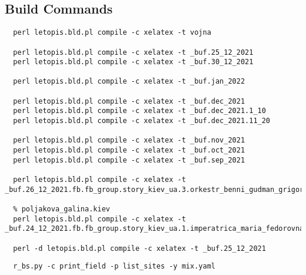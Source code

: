  
 
 
 
 

\subsection{Build Commands}

\begin{Verbatim}
  perl letopis.bld.pl compile -c xelatex -t vojna

  perl letopis.bld.pl compile -c xelatex -t _buf.25_12_2021
  perl letopis.bld.pl compile -c xelatex -t _buf.30_12_2021

  perl letopis.bld.pl compile -c xelatex -t _buf.jan_2022

  perl letopis.bld.pl compile -c xelatex -t _buf.dec_2021
  perl letopis.bld.pl compile -c xelatex -t _buf.dec_2021.1_10
  perl letopis.bld.pl compile -c xelatex -t _buf.dec_2021.11_20

  perl letopis.bld.pl compile -c xelatex -t _buf.nov_2021
  perl letopis.bld.pl compile -c xelatex -t _buf.oct_2021
  perl letopis.bld.pl compile -c xelatex -t _buf.sep_2021

  perl letopis.bld.pl compile -c xelatex -t _buf.26_12_2021.fb.fb_group.story_kiev_ua.3.orkestr_benni_gudman_grigorij_chapkis_1962

  % poljakova_galina.kiev
  perl letopis.bld.pl compile -c xelatex -t _buf.24_12_2021.fb.fb_group.story_kiev_ua.1.imperatrica_maria_fedorovna

  perl -d letopis.bld.pl compile -c xelatex -t _buf.25_12_2021

\end{Verbatim}

\begin{Verbatim}
  r_bs.py -c print_field -p list_sites -y mix.yaml
\end{Verbatim}
